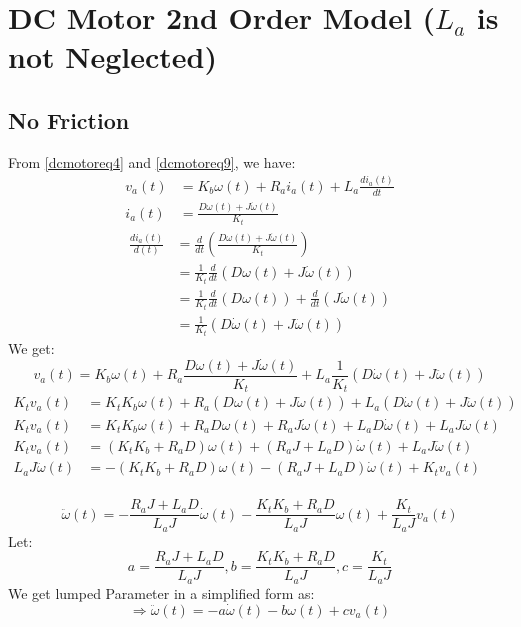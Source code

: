 \section{DC Motor 2nd Order Model ($ L_a $ is not Neglected)}
\subsection{No Friction}
From \autoref{dcmotoreq4} and \autoref{dcmotoreq9}, we have:
\[\begin{split}
	v_a(t) &= K_b \omega(t) + R_a i_a(t) + L_a \frac{di_a(t)}{dt} \\
	i_a(t) &= \frac{D\omega(t) + J \dot{\omega}(t)}{K_t}
\end{split}\]
\[\begin{split}
	\frac{di_a(t)}{d(t)} &= \frac{d}{dt}\left(\frac{D\omega(t) + J \dot{\omega}(t)}{K_t}\right) \\
	&= \frac{1}{K_t}\frac{d}{dt}(D\omega(t) + J \dot{\omega}(t))\\
	&= \frac{1}{K_t} \frac{d}{dt}(D\omega(t)) + \frac{d}{dt}(J \dot{\omega}(t)) \\
	&= \frac{1}{K_t} (D\dot{\omega}(t) + J \ddot{\omega}(t))
\end{split}\]
We get:
\begin{equation}
	v_a(t) = K_b \omega(t) + R_a \frac{D\omega(t) + J \dot{\omega}(t)}{K_t} + L_a\frac{1}{K_t} (D\dot{\omega}(t) + J \ddot{\omega}(t))
	\label{dcmotoreq15}
\end{equation}
\[\begin{split}
	K_tv_a(t) &= K_tK_b \omega(t) + R_a (D\omega(t) + J \dot{\omega}(t)) + L_a (D\dot{\omega}(t) + J \ddot{\omega}(t)) \\
	K_tv_a(t) &= K_tK_b \omega(t) + R_a D\omega(t) + R_a J \dot{\omega}(t) + L_a D\dot{\omega}(t) + L_aJ \ddot{\omega}(t) \\
	K_tv_a(t) &= (K_tK_b + R_a D) \omega(t) + (R_a J + L_a D) \dot{\omega}(t) + L_aJ \ddot{\omega}(t) \\
	L_aJ \ddot{\omega}(t) &= -(K_tK_b + R_a D) \omega(t) - (R_a J + L_a D) \dot{\omega}(t) + K_tv_a(t) \\
\end{split}\]
\begin{tcolorbox}[title=Lumped Parameters without Friction 2nd Order]
	\[\ddot{\omega}(t) = - \frac{R_a J + L_a D}{L_aJ} \dot{\omega}(t) -\frac{K_tK_b + R_a D}{L_aJ} \omega(t)  + \frac{K_t}{L_aJ}v_a(t)\]
	Let:
	\[
	a = \frac{R_a J + L_a D}{L_aJ} , b = \frac{K_tK_b + R_a D}{L_aJ} , c = \frac{K_t}{L_aJ}
	\]
	We get lumped Parameter in a simplified form as:
	\begin{equation}
		\Rightarrow \ddot{\omega}(t) = - a\dot{\omega}(t) - b\omega(t) + cv_a(t)
		\label{dcmotoreq16}
	\end{equation}
\end{tcolorbox}


